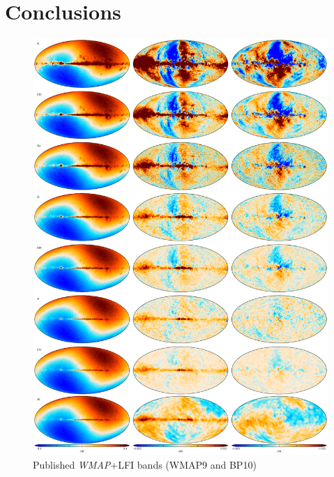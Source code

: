 \documentclass[twocolumn]{../../common/aa}
\begin{document}
\section{Conclusions}

\begin{figure}
	\centering
	\includegraphics[width=0.93\linewidth]{figures/megaplot_official.pdf}
  \caption{Published \textit{WMAP}+LFI bands (WMAP9 and BP10)}
\end{figure}
\end{document}
